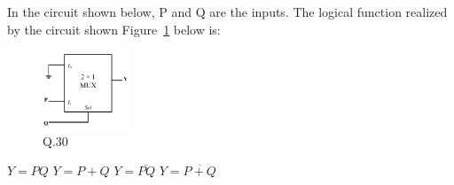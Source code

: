 \documentclass[a4, 12pt, addpoints]{exam}
\begin{document}
\begin{questions}
\question In the circuit shown below, P and Q are the inputs. The logical function realized by the circuit shown Figure~\ref{fig:2} below is:
\begin{figure}[H]
\centering
\includegraphics[width=0.23\textwidth]{mux}
\caption{Q.30}
\label{fig:2}
\end{figure}
\begin{oneparchoices}
    \choice $Y = PQ$
    \choice $Y=P+Q$
    \choice $Y = \overline{PQ}$
    \CorrectChoice $Y= \overline{P + Q}$
    
\end{oneparchoices}



\vspace{0.10in}

\end{questions}
\end{document}

